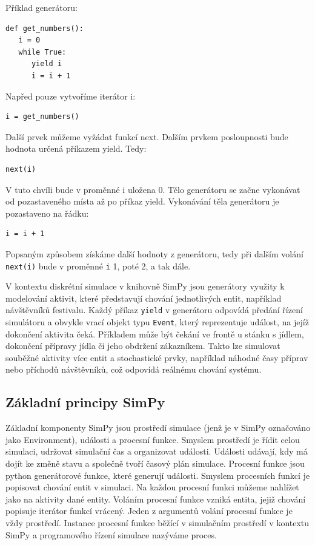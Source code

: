 \documentclass[12pt,a4paper]{article}
\begin{document}
\noindent Příklad generátoru:
 \begin{verbatim} 
def get_numbers():
   i = 0
   while True:
      yield i
      i = i + 1
\end{verbatim}
Napřed pouze vytvoříme iterátor i: 
 \begin{verbatim} 
i = get_numbers()
\end{verbatim}
Další prvek můžeme vyžádat funkcí next. 
Dalším prvkem posloupnosti bude hodnota určená příkazem yield. Tedy:
 \begin{verbatim} 
next(i)
\end{verbatim}
V tuto chvíli bude v proměnné i uložena 0. Tělo generátoru se začne vykonávat od pozastaveného místa až po příkaz yield.  Vykonávání těla generátoru je pozastaveno na řádku:
 \begin{verbatim} 
i = i + 1
\end{verbatim}
Popsaným způsobem získáme další hodnoty z generátoru, tedy při dalším volání \texttt{next(i)} bude v proměnné \texttt{i} 1, poté 2, a tak dále.

V kontextu diskrétní simulace v knihovně SimPy jsou generátory využity k modelování aktivit, které představují chování jednotlivých entit, například návštěvníků festivalu. Každý příkaz \texttt{yield} v generátoru odpovídá předání řízení simulátoru a obvykle vrací objekt typu \texttt{Event}, který reprezentuje událost, na jejíž dokončení aktivita čeká. Příkladem může být čekání ve frontě u stánku s jídlem, dokončení přípravy jídla či jeho obdržení zákazníkem. Takto lze simulovat souběžné aktivity více entit a stochastické prvky, například náhodné časy příprav nebo příchodů návštěvníků, což odpovídá reálnému chování systému.

\subsection{Základní principy SimPy}
Základní komponenty SimPy jsou prostředí simulace (jenž je v SimPy označováno jako Environment), události a procesní funkce. Smyslem prostředí je řídit celou simulaci, udržovat simulační čas a organizovat události. Události udávají, kdy má dojít ke změně stavu a společně tvoří časový plán simulace. Procesní funkce jsou python generátorové funkce, které generují události. Smyslem procesních funkcí je popisovat chování entit v simulaci. Na každou procesní funkci můžeme nahlížet jako na aktivity dané entity. Voláním procesní funkce vzniká entita, jejiž chování popisuje iterátor funkcí vrácený. Jeden z argumentů volání procesní funkce je vždy prostředí. Instance procesní funkce běžící v simulačním prostředí v kontextu SimPy a programového řízení simulace nazýváme proces.
\end{document}
